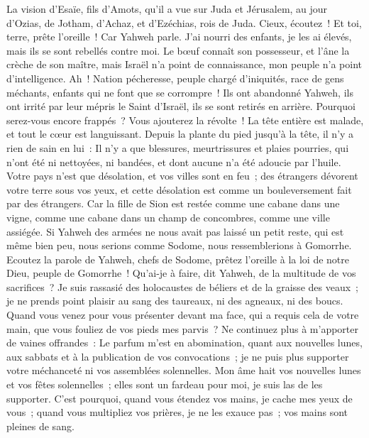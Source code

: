\begin{multicols}{2}
\VerseOne{}La vision d'Esaïe, fils d'Amots, qu'il a vue sur Juda et Jérusalem, au jour d'Ozias, de Jotham, d'Achaz, et d'Ezéchias, rois de Juda.
Cieux, écoutez~! Et toi, terre, prête l'oreille~! Car Yahweh parle. J'ai nourri des enfants, je les ai élevés, mais ils se sont rebellés contre moi.
Le bœuf connaît son possesseur, et l'âne la crèche de son maître, mais Israël n'a point de connaissance, mon peuple n'a point d'intelligence.
Ah~! Nation pécheresse, peuple chargé d'iniquités, race de gens méchants, enfants qui ne font que se corrompre~! Ils ont abandonné Yahweh, ils ont irrité par leur mépris le Saint d'Israël, ils se sont retirés en arrière.
Pourquoi serez-vous encore frappés~? Vous ajouterez la révolte~! La tête entière est malade, et tout le cœur est languissant.
Depuis la plante du pied jusqu'à la tête, il n'y a rien de sain en lui~: Il n'y a que blessures, meurtrissures et plaies pourries, qui n'ont été ni nettoyées, ni bandées, et dont aucune n'a été adoucie par l'huile.
Votre pays n'est que désolation, et vos villes sont en feu~; des étrangers dévorent votre terre sous vos yeux, et cette désolation est comme un bouleversement fait par des étrangers.
Car la fille de Sion est restée comme une cabane dans une vigne, comme une cabane dans un champ de concombres, comme une ville assiégée.
Si Yahweh des armées ne nous avait pas laissé un petit reste, qui est même bien peu, nous serions comme Sodome, nous ressemblerions à Gomorrhe.
Ecoutez la parole de Yahweh, chefs de Sodome, prêtez l'oreille à la loi de notre Dieu, peuple de Gomorrhe~!
Qu'ai-je à faire, dit Yahweh, de la multitude de vos sacrifices~? Je suis rassasié des holocaustes de béliers et de la graisse des veaux~; je ne prends point plaisir au sang des taureaux, ni des agneaux, ni des boucs.
Quand vous venez pour vous présenter devant ma face, qui a requis cela de votre main, que vous fouliez de vos pieds mes parvis~?
Ne continuez plus à m'apporter de vaines offrandes~: Le parfum m'est en abomination, quant aux nouvelles lunes, aux sabbats et à la publication de vos convocations~; je ne puis plus supporter votre méchanceté ni vos assemblées solennelles.
Mon âme hait vos nouvelles lunes et vos fêtes solennelles~; elles sont un fardeau pour moi, je suis las de les supporter.
C'est pourquoi, quand vous étendez vos mains, je cache mes yeux de vous~; quand vous multipliez vos prières, je ne les exauce pas~; vos mains sont pleines de sang.

\end{multicols}
